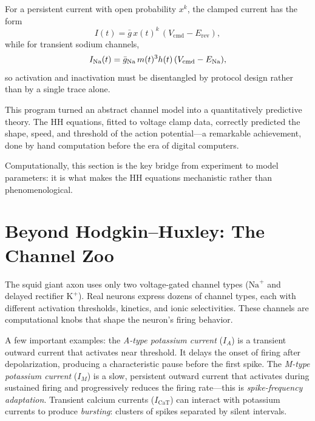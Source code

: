 For a persistent current with open probability $x^k$, the clamped current has the form
%
\begin{equation}
  I(t) = \bar g\,x(t)^k\,(V_{\text{cmd}}-E_{\text{rev}}),
  \label{eq:clamp-persistent}
\end{equation}
%
while for transient sodium channels,
%
\begin{equation}
  I_{\text{Na}}(t)=\bar g_{\text{Na}}\,m(t)^3h(t)\,(V_{\text{cmd}}-E_{\mathrm{Na}}),
  \label{eq:clamp-na}
\end{equation}
%
so activation and inactivation must be disentangled by protocol design rather than by a single trace alone.

This program turned an abstract channel model into a quantitatively predictive theory. The HH equations, fitted to voltage clamp data, correctly predicted the shape, speed, and threshold of the action potential---a remarkable achievement, done by hand computation before the era of digital computers.

Computationally, this section is the key bridge from experiment to model parameters: it is what makes the HH equations mechanistic rather than phenomenological.

\section{Beyond Hodgkin--Huxley: The Channel Zoo}
\label{sec:channel-zoo}

The squid giant axon uses only two voltage-gated channel types ($\text{Na}^+$ and delayed rectifier $\text{K}^+$). Real neurons express dozens of channel types, each with different activation thresholds, kinetics, and ionic selectivities. These channels are computational knobs that shape the neuron's firing behavior.

A few important examples: the \emph{A-type potassium current} ($I_A$) is a transient outward current that activates near threshold. It delays the onset of firing after depolarization, producing a characteristic pause before the first spike. The \emph{M-type potassium current} ($I_M$) is a slow, persistent outward current that activates during sustained firing and progressively reduces the firing rate---this is \emph{spike-frequency adaptation}. Transient calcium currents ($I_{\text{CaT}}$) can interact with potassium currents to produce \emph{bursting}: clusters of spikes separated by silent intervals.

